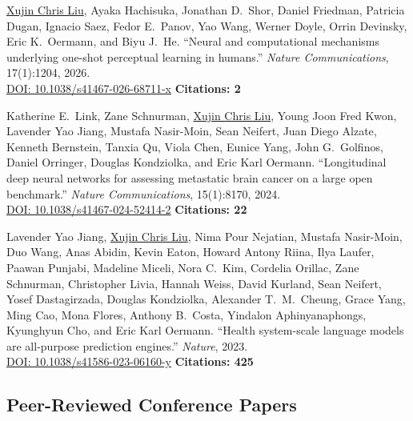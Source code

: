 \documentclass[11pt,a4paper]{article}
\begin{document}
\begin{enumerate}[leftmargin=*, label={[\arabic*]}, itemsep=6pt]

  \item \underline{Xujin Chris Liu}, Ayaka Hachisuka, Jonathan D.\ Shor, Daniel Friedman, Patricia Dugan, Ignacio Saez, Fedor E.\ Panov, Yao Wang, Werner Doyle, Orrin Devinsky, Eric K.\ Oermann, and Biyu J.\ He.
    ``Neural and computational mechanisms underlying one-shot perceptual learning in humans.''
    \textit{Nature Communications}, 17(1):1204, 2026. \\
    \href{https://doi.org/10.1038/s41467-026-68711-x}{DOI: 10.1038/s41467-026-68711-x} \hfill \textbf{Citations: 2}

  \item Katherine E.\ Link, Zane Schnurman, \underline{Xujin Chris Liu}, Young Joon Fred Kwon, Lavender Yao Jiang, Mustafa Nasir-Moin, Sean Neifert, Juan Diego Alzate, Kenneth Bernstein, Tanxia Qu, Viola Chen, Eunice Yang, John G.\ Golfinos, Daniel Orringer, Douglas Kondziolka, and Eric Karl Oermann.
    ``Longitudinal deep neural networks for assessing metastatic brain cancer on a large open benchmark.''
    \textit{Nature Communications}, 15(1):8170, 2024. \\
    \href{https://doi.org/10.1038/s41467-024-52414-2}{DOI: 10.1038/s41467-024-52414-2} \hfill \textbf{Citations: 22}

  \item Lavender Yao Jiang, \underline{Xujin Chris Liu}, Nima Pour Nejatian, Mustafa Nasir-Moin, Duo Wang, Anas Abidin, Kevin Eaton, Howard Antony Riina, Ilya Laufer, Paawan Punjabi, Madeline Miceli, Nora C.\ Kim, Cordelia Orillac, Zane Schnurman, Christopher Livia, Hannah Weiss, David Kurland, Sean Neifert, Yosef Dastagirzada, Douglas Kondziolka, Alexander T.\ M.\ Cheung, Grace Yang, Ming Cao, Mona Flores, Anthony B.\ Costa, Yindalon Aphinyanaphongs, Kyunghyun Cho, and Eric Karl Oermann.
    ``Health system-scale language models are all-purpose prediction engines.''
    \textit{Nature}, 2023. \\
    \href{https://doi.org/10.1038/s41586-023-06160-y}{DOI: 10.1038/s41586-023-06160-y} \hfill \textbf{Citations: 425}

\end{enumerate}

\subsection*{Peer-Reviewed Conference Papers}
\end{document}
